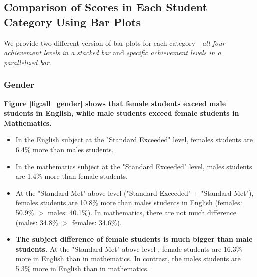 \documentclass[11pt]{article}
\begin{document}
\subsection{Comparison of Scores in Each Student Category Using Bar Plots}
\label{Comparison for All Students Using Bar Plot}

We provide two different version of bar plots for each category---\textit{all four achievement levels in a stacked bar} and \textit{specific achievement levels in a parallelized bar}.

\subsubsection{Gender}
\textbf{Figure \ref{fig:all_gender} shows that female students exceed male students in English, while male students exceed female students in Mathematics.}
\begin{itemize}
	\item In the English subject at the "Standard Exceeded" level, females students are 6.4\% more than males students.
\item In the mathematics subject at the "Standard Exceeded" level, males students are 1.4\% more than female students.
\item At the "Standard Met" above level ("Standard Exceeded" + "Standard Met"), females students are 10.8\% more than males students in English (females: 50.9\% $>$ males: 40.1\%). In mathematics, there are not much difference (males: 34.8\% $>$ females: 34.6\%).
\item \textbf{The subject difference of female students is much bigger than male students.}  At the "Standard Met" above level , female students are 16.3\% more in English than in mathematics. In contrast, the males students are 5.3\% more in English than in mathematics.  
\end{itemize}
\end{document}
